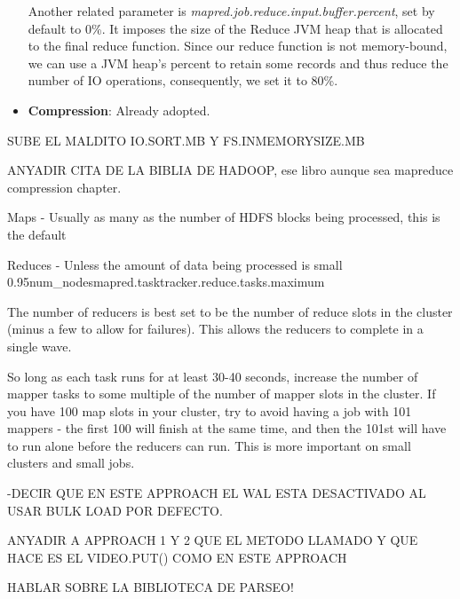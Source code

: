 \begin{itemize}
\par 
Another related parameter is \textit{mapred.job.reduce.input.buffer.percent}, set by default to 0\%. It imposes the size of the Reduce JVM heap that is allocated to the final reduce function. Since our reduce function is not memory-bound, we can use a JVM heap's percent  to retain some records and thus reduce the number of IO operations, consequently, we set it to 80\%.





\item \textbf{Compression}: Already adopted.


\end{itemize}









SUBE EL MALDITO IO.SORT.MB Y FS.INMEMORYSIZE.MB

ANYADIR CITA DE LA BIBLIA DE HADOOP, ese libro aunque sea mapreduce compression chapter.

Maps 
- Usually as many as the number of HDFS blocks being 
processed, this is the default 

Reduces 
- Unless the amount of data being processed is small 
0.95\*num\_nodes\*mapred.tasktracker.reduce.tasks.maximum

The number of reducers is best set to be the number of reduce slots in the cluster (minus a few to allow for failures). This allows the reducers to complete in a single wave.

So long as each task runs for at least 30-40 seconds, increase the number of mapper tasks to some multiple of the number of mapper slots in the cluster. If you have 100 map slots in your cluster, try to avoid having a job with 101 mappers - the first 100 will finish at the same time, and then the 101st will have to run alone before the reducers can run. This is more important on small clusters and small jobs.

-DECIR QUE EN ESTE APPROACH EL WAL ESTA DESACTIVADO AL USAR BULK LOAD POR DEFECTO.

ANYADIR A APPROACH 1 Y 2 QUE EL METODO LLAMADO Y QUE HACE ES EL VIDEO.PUT() COMO EN ESTE APPROACH

HABLAR SOBRE LA BIBLIOTECA DE PARSEO!





